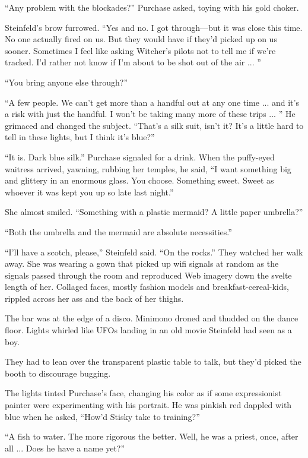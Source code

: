 ``Any problem with the blockades?'' Purchase asked, toying with his gold choker.

Steinfeld's brow furrowed. ``Yes and no. I got through—but it was close this time. No one actually fired on us. But they would have if they'd picked up on us sooner. Sometimes I feel like asking Witcher's pilots not to tell me if we're tracked. I'd rather not know if I'm about to be shot out of the air ... ''

``You bring anyone else through?''

``A few people. We can't get more than a handful out at any one time ... and it's a risk with just the handful. I won't be taking many more of these trips ... '' He grimaced and changed the subject. ``That's a silk suit, isn't it? It's a little hard to tell in these lights, but I think it's blue?''

``It is. Dark blue silk.'' Purchase signaled for a drink. When the puffy-eyed waitress arrived, yawning, rubbing her temples, he said, ``I want something big and glittery in an enormous glass. You choose. Something sweet. Sweet as whoever it was kept you up so late last night.''

She almost smiled. ``Something with a plastic mermaid? A little paper umbrella?''

``Both the umbrella and the mermaid are absolute necessities.''

``I'll have a scotch, please,'' Steinfeld said. ``On the rocks.'' They watched her walk away. She was wearing a gown that picked up wifi signals at random as the signals passed through the room and reproduced Web imagery down the svelte length of her. Collaged faces, mostly fashion models and breakfast-cereal-kids, rippled across her ass and the back of her thighs.

The bar was at the edge of a disco. Minimono droned and thudded on the dance floor. Lights whirled like UFOs landing in an old movie Steinfeld had seen as a boy.

They had to lean over the transparent plastic table to talk, but they'd picked the booth to discourage bugging.

The lights tinted Purchase's face, changing his color as if some expressionist painter were experimenting with his portrait. He was pinkish red dappled with blue when he asked, ``How'd Stisky take to training?''

``A fish to water. The more rigorous the better. Well, he was a priest, once, after all ... Does he have a name yet?''

